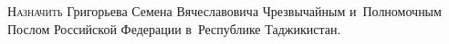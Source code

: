 \documentclass{../president-decree}
\begin{document}

\lettrine{Н}{азначить} Григорьева Семена Вячеславовича Чрезвычайным и~Полномочным Послом Российской Федерации в~Республике Таджикистан.

\end{document}
